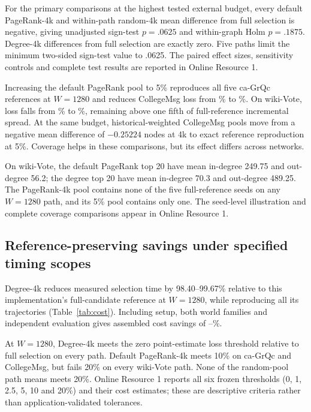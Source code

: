 \documentclass[smallextended]{svjour3}
\begin{document}
For the primary comparisons at the highest tested external budget, every default PageRank-4k and within-path random-4k mean difference from full selection is negative, giving unadjusted sign-test $p=.0625$ and within-graph Holm $p=.1875$. Degree-4k differences from full selection are exactly zero. Five paths limit the minimum two-sided sign-test value to .0625. The paired effect sizes, sensitivity controls and complete test results are reported in Online Resource 1.

Increasing the default PageRank pool to 5\% reproduces all five ca-GrQc references at $W=1280$ and reduces CollegeMsg loss from \CollegePRLoss{}\% to \CollegePRfiveLoss{}\%. On wiki-Vote, loss falls from \WikiPRLoss{}\% to \WikiPRfiveLoss{}\%, remaining above one fifth of full-reference incremental spread. At the same budget, historical-weighted CollegeMsg pools move from a negative mean difference of $-0.25224$ nodes at 4k to exact reference reproduction at 5\%. Coverage helps in these comparisons, but its effect differs across networks.

On wiki-Vote, the default PageRank top 20 have mean in-degree 249.75 and out-degree 56.2; the degree top 20 have mean in-degree 70.3 and out-degree 489.25. The PageRank-4k pool contains none of the five full-reference seeds on any $W=1280$ path, and its 5\% pool contains only one. The seed-level illustration and complete coverage comparisons appear in Online Resource 1.

\subsection{Reference-preserving savings under specified timing scopes}
Degree-4k reduces measured selection time by 98.40--99.67\% relative to this implementation's full-candidate reference at $W=1280$, while reproducing all its trajectories (Table~\ref{tab:cost}). Including setup, both world families and independent evaluation gives assembled cost savings of \CollegeDegreeSaving{}--\WikiDegreeSaving{}\%.


At $W=1280$, Degree-4k meets the zero point-estimate loss threshold relative to full selection on every path. Default PageRank-4k meets 10\% on ca-GrQc and CollegeMsg, but fails 20\% on every wiki-Vote path. None of the random-pool path means meets 20\%. Online Resource 1 reports all six frozen thresholds (0, 1, 2.5, 5, 10 and 20\%) and their cost estimates; these are descriptive criteria rather than application-validated tolerances.
\end{document}
